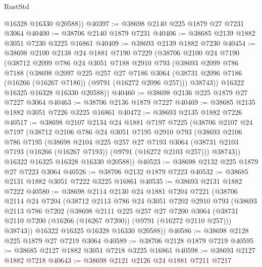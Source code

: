 \begin{lexlean}{RustStd}
\begin{coremodule}
        @16328
        @16330
        @20588))
@40397 := @38698 @2140 @225 @1879 @27 @7231 @3064
@40400 := @38706 @2140 @1879 @7231
@40406 := @38685 @2139 @1882 @3051 @7230 @3225 @16861
@40409 := @38693 @2139 @1882 @7230
@40454 := @38698
    @2100
    @2138
    @24
    @1881
    @7190
    @7229
    (@38706
      @2100
      @24
      @7190
      (@38712
        @2099
        @786
        @24
        @3051
        @7188
        @2910
        @793
        (@38693
          @2099
          @786
          @7188
          (@38698
            @2097
            @225
            @257
            @27
            @7186
            @3064
            (@38731 @2096 @7186 (@16266 (@16267 @7186)) (@9791 (@16272 @2096 @257)))
            @38743))
        @16322
        @16325
        @16328
        @16330
        @20588))
@40460 := @38698 @2136 @225 @1879 @27 @7227 @3064
@40463 := @38706 @2136 @1879 @7227
@40469 := @38685 @2135 @1882 @3051 @7226 @3225 @16861
@40472 := @38693 @2135 @1882 @7226
@40517 := @38698
    @2107
    @2134
    @24
    @1881
    @7197
    @7225
    (@38706
      @2107
      @24
      @7197
      (@38712
        @2106
        @786
        @24
        @3051
        @7195
        @2910
        @793
        (@38693
          @2106
          @786
          @7195
          (@38698
            @2104
            @225
            @257
            @27
            @7193
            @3064
            (@38731 @2103 @7193 (@16266 (@16267 @7193)) (@9791 (@16272 @2103 @257)))
            @38743))
        @16322
        @16325
        @16328
        @16330
        @20588))
@40523 := @38698 @2132 @225 @1879 @27 @7223 @3064
@40526 := @38706 @2132 @1879 @7223
@40532 := @38685 @2131 @1882 @3051 @7222 @3225 @16861
@40535 := @38693 @2131 @1882 @7222
@40580 := @38698
    @2114
    @2130
    @24
    @1881
    @7204
    @7221
    (@38706
      @2114
      @24
      @7204
      (@38712
        @2113
        @786
        @24
        @3051
        @7202
        @2910
        @793
        (@38693
          @2113
          @786
          @7202
          (@38698
            @2111
            @225
            @257
            @27
            @7200
            @3064
            (@38731 @2110 @7200 (@16266 (@16267 @7200)) (@9791 (@16272 @2110 @257)))
            @38743))
        @16322
        @16325
        @16328
        @16330
        @20588))
@40586 := @38698 @2128 @225 @1879 @27 @7219 @3064
@40589 := @38706 @2128 @1879 @7219
@40595 := @38685 @2127 @1882 @3051 @7218 @3225 @16861
@40598 := @38693 @2127 @1882 @7218
@40643 := @38698
    @2121
    @2126
    @24
    @1881
    @7211
    @7217

\end{coremodule}
\end{lexlean}
